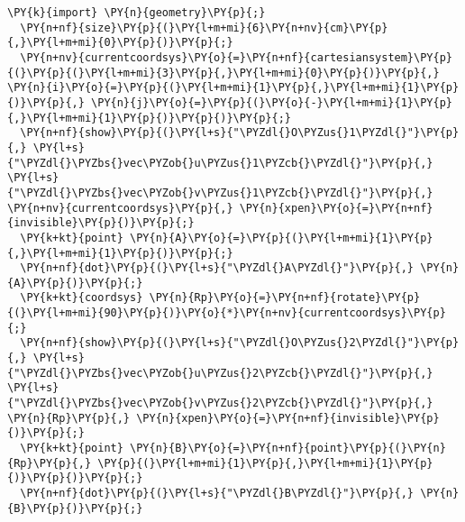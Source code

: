 \begin{Verbatim}[commandchars=\\\{\}]
  \PY{k}{import} \PY{n}{geometry}\PY{p}{;}
  \PY{n+nf}{size}\PY{p}{(}\PY{l+m+mi}{6}\PY{n+nv}{cm}\PY{p}{,}\PY{l+m+mi}{0}\PY{p}{)}\PY{p}{;}
  \PY{n+nv}{currentcoordsys}\PY{o}{=}\PY{n+nf}{cartesiansystem}\PY{p}{(}\PY{p}{(}\PY{l+m+mi}{3}\PY{p}{,}\PY{l+m+mi}{0}\PY{p}{)}\PY{p}{,} \PY{n}{i}\PY{o}{=}\PY{p}{(}\PY{l+m+mi}{1}\PY{p}{,}\PY{l+m+mi}{1}\PY{p}{)}\PY{p}{,} \PY{n}{j}\PY{o}{=}\PY{p}{(}\PY{o}{-}\PY{l+m+mi}{1}\PY{p}{,}\PY{l+m+mi}{1}\PY{p}{)}\PY{p}{)}\PY{p}{;}
  \PY{n+nf}{show}\PY{p}{(}\PY{l+s}{"\PYZdl{}O\PYZus{}1\PYZdl{}"}\PY{p}{,} \PY{l+s}{"\PYZdl{}\PYZbs{}vec\PYZob{}u\PYZus{}1\PYZcb{}\PYZdl{}"}\PY{p}{,} \PY{l+s}{"\PYZdl{}\PYZbs{}vec\PYZob{}v\PYZus{}1\PYZcb{}\PYZdl{}"}\PY{p}{,} \PY{n+nv}{currentcoordsys}\PY{p}{,} \PY{n}{xpen}\PY{o}{=}\PY{n+nf}{invisible}\PY{p}{)}\PY{p}{;}
  \PY{k+kt}{point} \PY{n}{A}\PY{o}{=}\PY{p}{(}\PY{l+m+mi}{1}\PY{p}{,}\PY{l+m+mi}{1}\PY{p}{)}\PY{p}{;}
  \PY{n+nf}{dot}\PY{p}{(}\PY{l+s}{"\PYZdl{}A\PYZdl{}"}\PY{p}{,} \PY{n}{A}\PY{p}{)}\PY{p}{;}
  \PY{k+kt}{coordsys} \PY{n}{Rp}\PY{o}{=}\PY{n+nf}{rotate}\PY{p}{(}\PY{l+m+mi}{90}\PY{p}{)}\PY{o}{*}\PY{n+nv}{currentcoordsys}\PY{p}{;}
  \PY{n+nf}{show}\PY{p}{(}\PY{l+s}{"\PYZdl{}O\PYZus{}2\PYZdl{}"}\PY{p}{,} \PY{l+s}{"\PYZdl{}\PYZbs{}vec\PYZob{}u\PYZus{}2\PYZcb{}\PYZdl{}"}\PY{p}{,} \PY{l+s}{"\PYZdl{}\PYZbs{}vec\PYZob{}v\PYZus{}2\PYZcb{}\PYZdl{}"}\PY{p}{,} \PY{n}{Rp}\PY{p}{,} \PY{n}{xpen}\PY{o}{=}\PY{n+nf}{invisible}\PY{p}{)}\PY{p}{;}
  \PY{k+kt}{point} \PY{n}{B}\PY{o}{=}\PY{n+nf}{point}\PY{p}{(}\PY{n}{Rp}\PY{p}{,} \PY{p}{(}\PY{l+m+mi}{1}\PY{p}{,}\PY{l+m+mi}{1}\PY{p}{)}\PY{p}{)}\PY{p}{;}
  \PY{n+nf}{dot}\PY{p}{(}\PY{l+s}{"\PYZdl{}B\PYZdl{}"}\PY{p}{,} \PY{n}{B}\PY{p}{)}\PY{p}{;}
\end{Verbatim}
